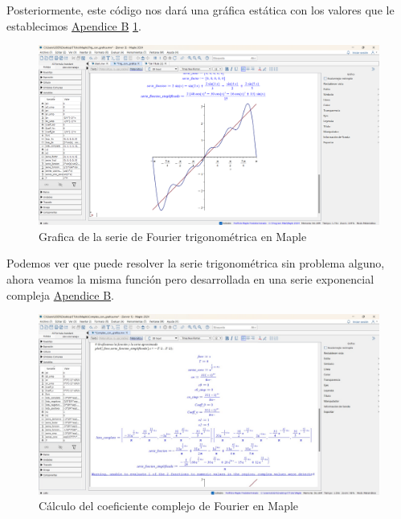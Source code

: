 Posteriormente, este código nos dará una gráfica estática con los valores que le establecimos \hyperref[app2:trig-code-maple]{Apendice B} \ref{fig:maple-trig-series-graph}. 
\begin{figure}[H]
	\centering
	\includegraphics[width=1\textwidth]{img/chapter02/maple-trig-graph.png}
	\caption{Grafica de la serie de Fourier trigonométrica en Maple}
	\label{fig:maple-trig-series-graph}  %
\end{figure}
Podemos ver que puede resolver la serie trigonométrica sin problema alguno, ahora veamos la misma función pero desarrollada en una serie exponencial compleja  \hyperref[app2:complex-code-maple]{Apendice B}.
\begin{figure}[H]
	\centering
	\includegraphics[width=1\textwidth]{img/chapter02/maple-complex-series-coeff.jpeg}
	\caption{Cálculo del coeficiente complejo de Fourier en Maple}
	\label{fig:maple-complex-series}  %
\end{figure}

